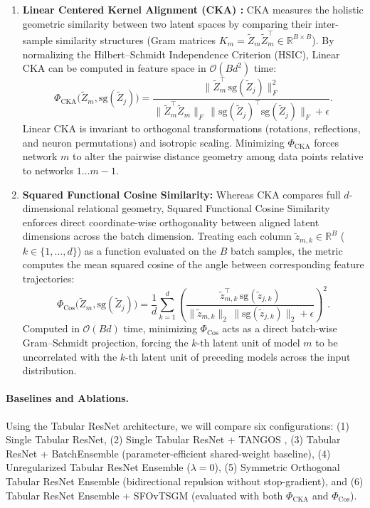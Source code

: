 \documentclass[11pt, a4paper]{article}
\begin{document}
\begin{enumerate}
    \item \textbf{Linear Centered Kernel Alignment (CKA) \cite{kornblith2019similarity}:} CKA measures the holistic geometric similarity between two latent spaces by comparing their inter-sample similarity structures (Gram matrices $K_m = \tilde{Z}_m \tilde{Z}_m^\top \in \mathbb{R}^{B \times B}$). By normalizing the Hilbert--Schmidt Independence Criterion (HSIC), Linear CKA can be computed in feature space in $\mathcal{O}(B d^2)$ time:
    \begin{equation}
        \Phi_{\text{CKA}}\big(\tilde{Z}_m, \text{sg}(\tilde{Z}_j)\big) = \frac{\|\tilde{Z}_m^\top \, \text{sg}(\tilde{Z}_j)\|_F^2}{\|\tilde{Z}_m^\top \tilde{Z}_m\|_F \, \|\text{sg}(\tilde{Z}_j)^\top \text{sg}(\tilde{Z}_j)\|_F + \epsilon}.
    \end{equation}
    Linear CKA is invariant to orthogonal transformations (rotations, reflections, and neuron permutations) and isotropic scaling. Minimizing $\Phi_{\text{CKA}}$ forces network $m$ to alter the pairwise distance geometry among data points relative to networks $1 \dots m-1$.
    
    \item \textbf{Squared Functional Cosine Similarity:} Whereas CKA compares full $d$-dimensional relational geometry, Squared Functional Cosine Similarity enforces direct coordinate-wise orthogonality between aligned latent dimensions across the batch dimension. Treating each column $\tilde{z}_{m,k} \in \mathbb{R}^B$ ($k \in \{1, \dots, d\}$) as a function evaluated on the $B$ batch samples, the metric computes the mean squared cosine of the angle between corresponding feature trajectories:
    \begin{equation}
        \Phi_{\text{Cos}}\big(\tilde{Z}_m, \text{sg}(\tilde{Z}_j)\big) = \frac{1}{d} \sum_{k=1}^{d} \left( \frac{\tilde{z}_{m,k}^\top \, \text{sg}(\tilde{z}_{j,k})}{\|\tilde{z}_{m,k}\|_2 \, \|\text{sg}(\tilde{z}_{j,k})\|_2 + \epsilon} \right)^2.
    \end{equation}
    Computed in $\mathcal{O}(B d)$ time, minimizing $\Phi_{\text{Cos}}$ acts as a direct batch-wise Gram--Schmidt projection, forcing the $k$-th latent unit of model $m$ to be uncorrelated with the $k$-th latent unit of preceding models across the input distribution.
\end{enumerate}

\paragraph{Baselines and Ablations.}
Using the Tabular ResNet architecture, we will compare six configurations: (1) Single Tabular ResNet, (2) Single Tabular ResNet + TANGOS \cite{jeffares2023tangos}, (3) Tabular ResNet + BatchEnsemble \cite{wen2020batchensemble} (parameter-efficient shared-weight baseline), (4) Unregularized Tabular ResNet Ensemble ($\lambda = 0$), (5) Symmetric Orthogonal Tabular ResNet Ensemble (bidirectional repulsion without stop-gradient), and (6) Tabular ResNet Ensemble + SFOvTSGM (evaluated with both $\Phi_{\text{CKA}}$ and $\Phi_{\text{Cos}}$).
\end{document}
